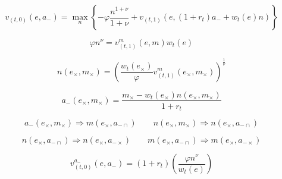 $$
    v_{(t,0)}(e, a_{-}) = \max_{n} \left\{ - \varphi \frac{n^{1+\nu}}{1+\nu} + v_{(t,1)}(e,(1 + r_t)a_{-} + w_t(e) n ) \right\}
$$

$$
    \varphi n^{\nu} = v_{(t,1)}^m(e,m) w_t(e) \tag{euler}
$$

$$
    n(e_\times,m_\times) = \left(\frac{ w_t(e_\times)}{\varphi}v_{(t,1)}^m(e_\times,m_\times)\right)^{\frac{1}{\nu}} \tag{egm}
$$

$$
    a_{-}(e_\times, m_\times) = \frac{m_\times - w_t(e_\times) n(e_\times,m_\times) }{1+r_t} \tag{budget}
$$

$$
    a_{-}(e_\times,m_\times) \Rightarrow m(e_\times, a_{-\cap}) \qquad n(e_\times,m_\times) \Rightarrow n(e_\times, a_{-\cap}) \tag{swap dims}
$$

$$
    n(e_\times, a_{-\cap}) \Rightarrow n(e_\times, a_{-\times}) \qquad m(e_\times, a_{-\cap}) \Rightarrow m(e_\times, a_{-\times}) \tag{regrid}
$$

$$
    v_{(t,0)}^{a_{-}}(e,a_{-}) = (1 + r_t) \left(\frac{\varphi n^{\nu}}{w_t(e)}\right) \tag{ec}
$$

